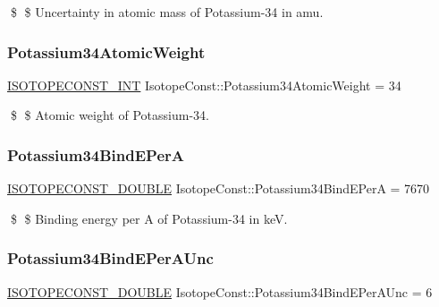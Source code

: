 \$ \$ Uncertainty in atomic mass of Potassium-\/34 in amu. \mbox{\label{group___isotope_const-_potassium-_k34_ga4b038b2bbb4063ba7462d9d5d5f40b86}} 
\subsubsection{\texorpdfstring{Potassium34\+Atomic\+Weight}{Potassium34AtomicWeight}}
{\footnotesize\ttfamily \mbox{\hyperlink{group___isotope_const-_macros_ga5f18360b3e99483a35c32d789e62621c}{I\+S\+O\+T\+O\+P\+E\+C\+O\+N\+S\+T\+\_\+\+I\+NT}} Isotope\+Const\+::\+Potassium34\+Atomic\+Weight = 34}

\$ \$ Atomic weight of Potassium-\/34. \mbox{\label{group___isotope_const-_potassium-_k34_gabbdb3eab23d6c71cb8c4b041515a677b}} 
\subsubsection{\texorpdfstring{Potassium34\+Bind\+E\+PerA}{Potassium34BindEPerA}}
{\footnotesize\ttfamily \mbox{\hyperlink{group___isotope_const-_macros_ga8f45a7272ce02c0b4c65c44636ed719a}{I\+S\+O\+T\+O\+P\+E\+C\+O\+N\+S\+T\+\_\+\+D\+O\+U\+B\+LE}} Isotope\+Const\+::\+Potassium34\+Bind\+E\+PerA = 7670}

\$ \$ Binding energy per A of Potassium-\/34 in keV. \mbox{\label{group___isotope_const-_potassium-_k34_ga42e03bd40dcb4a2844809eb7d8d4383c}} 
\subsubsection{\texorpdfstring{Potassium34\+Bind\+E\+Per\+A\+Unc}{Potassium34BindEPerAUnc}}
{\footnotesize\ttfamily \mbox{\hyperlink{group___isotope_const-_macros_ga8f45a7272ce02c0b4c65c44636ed719a}{I\+S\+O\+T\+O\+P\+E\+C\+O\+N\+S\+T\+\_\+\+D\+O\+U\+B\+LE}} Isotope\+Const\+::\+Potassium34\+Bind\+E\+Per\+A\+Unc = 6}

